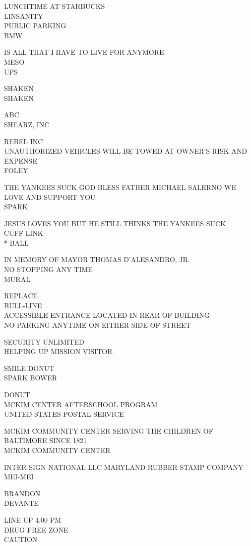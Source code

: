 \documentclass[10pt,letterpaper]{article}
\begin{document}
LUNCHTIME AT STARBUCKS\\
LINSANITY\\
PUBLIC PARKING\\
BMW

IS ALL THAT I HAVE TO LIVE FOR ANYMORE\\
MESO\\
UPS

SHAKEN\\
SHAKEN

ABC\\
SHEARZ, INC

REBEL INC\\
UNAUTHORIZED VEHICLES WILL BE TOWED AT OWNER'S RISK AND EXPENSE\\
FOLEY

THE YANKEES SUCK GOD BLESS FATHER MICHAEL SALERNO WE LOVE AND SUPPORT YOU\\
SPARK

JESUS LOVES YOU BUT HE STILL THINKS THE YANKEES SUCK\\
CUFF LINK\\
* BALL

IN MEMORY OF MAYOR THOMAS D'ALESANDRO, JR.\\
NO STOPPING ANY TIME\\
MURAL

REPLACE\\
BULL{-}LINE\\
ACCESSIBLE ENTRANCE LOCATED IN REAR OF BUILDING\\
NO PARKING ANYTIME ON EITHER SIDE OF STREET

SECURITY UNLIMITED\\
HELPING UP MISSION VISITOR

SMILE DONUT\\
SPARK BOWER

DONUT\\
MCKIM CENTER AFTERSCHOOL PROGRAM\\
UNITED STATES POSTAL SERVICE

MCKIM COMMUNITY CENTER SERVING THE CHILDREN OF BALTIMORE SINCE 1821\\
MCKIM COMMUNITY CENTER

INTER SIGN NATIONAL LLC MARYLAND RUBBER STAMP COMPANY\\
MEI{-}MEI

BRANDON\\
DEVANTE

LINE UP 4:00 PM\\
DRUG FREE ZONE\\
CAUTION
\end{document}
